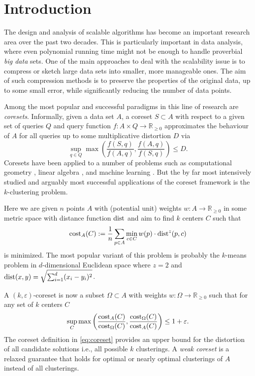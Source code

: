 \section{Introduction}

The design and analysis of scalable algorithms has become an important research area over the past two decades. This is particularly important in data analysis, where even polynomial running time might not be enough to handle proverbial \emph{big data} sets.
One of the main approaches to deal with the scalability issue is to compress or sketch large data sets into smaller, more manageable ones. The aim of such compression methods is to preserve the properties of the original data, up to some small error, while significantly reducing the number of data points.

Among the most popular and successful paradigms in this line of research are \emph{coresets}. Informally, given a data set $A$, a coreset $S\subset A$ with respect to a given set of queries $Q$ and query function $f: A\times Q \rightarrow \mathbb{R}_{\geq 0}$ approximates the behaviour of $A$ for all queries up to some multiplicative distortion $D$ via
$$ \sup_{q\in Q} \max\left( \frac{f(S,q)}{f(A,q)},\frac{f(A,q)}{f(S,q)}\right) \leq D.$$
Coresets have been applied to a number of problems such as computational geometry \cite{AHV05,Chan09}, linear algebra \cite{IndykMGR20,maalouf2019fast}, and machine learning \cite{MRM21,MunteanuSSW18}. But the by far most intensively studied and arguably most successful applications of the coreset framework is the $k$-clustering problem.

Here we are given $n$ points $A$ with (potential unit) weights $w:A\rightarrow \mathbb{R}_{\geq 0}$ in some metric space with distance function $\text{dist}$ and aim to find $k$ centers $C$ such that $$\text{cost}_A(C):= \frac{1}{n} \sum_{p\in A}  \min_{c\in C} w(p)\cdot \text{dist}^z(p,c)$$
is minimized. The most popular variant of this problem is probably the $k$-means problem in $d$-dimensional Euclidean space where $z=2$ and $\text{dist}(x,y) = \sqrt{\sum_{i=1}^d (x_i-y_i)^2}$.



A $(k,\varepsilon)$-coreset is now a subset $\Omega\subset A$ with weights $w:\Omega\rightarrow \mathbb{R}_{\geq 0}$ such that for any set of $k$ centers $C$
\begin{equation}
\label{eq:coreset}
\sup_{C} \max\left( \frac{\text{cost}_A(C)}{\text{cost}_{\Omega}(C)},\frac{\text{cost}_{\Omega}(C)}{\text{cost}_{A}(C)}\right) \leq 1+\varepsilon.
\end{equation}
The coreset definition in \cref{eq:coreset} provides an upper bound for the distortion of all candidate solutions i.e., all possible $k$ clusterings. 
A \emph{weak coreset} is a relaxed guarantee that holds for optimal or nearly optimal clusterings of $A$ instead of all clusterings.

